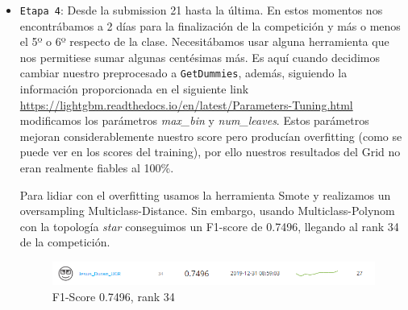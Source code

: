 \begin{itemize}
		\item \texttt{Etapa 4}: Desde la submission 21 hasta la última. En estos momentos nos encontrábamos a 2 días para la finalización de la competición y más o menos el 5º o 6º respecto de la clase. Necesitábamos usar alguna herramienta que nos permitiese sumar algunas centésimas más. Es aquí cuando decidimos cambiar nuestro preprocesado a \texttt{GetDummies}, además, siguiendo la información proporcionada en el siguiente link \url{https://lightgbm.readthedocs.io/en/latest/Parameters-Tuning.html} modificamos los parámetros \textit{max\_bin} y \textit{num\_leaves}.
		Estos parámetros mejoran considerablemente nuestro score pero producían overfitting (como se puede ver en los scores del training), por ello nuestros resultados del Grid no eran realmente fiables al 100\%.
		
		Para lidiar con el overfitting usamos la herramienta Smote y realizamos un oversampling Multiclass-Distance. Sin embargo, usando Multiclass-Polynom con la topología \textit{star} conseguimos un F1-score de 0.7496, llegando al rank 34 de la competición.
		
		
		\begin{figure}[H]
			\centering
			\includegraphics[width=1\textwidth]{img/pole.png}
			\caption{F1-Score 0.7496, rank 34}
		\end{figure}
	\end{itemize}
	
	
	
	
	
	
	
	
	
	
	
	
	
	
	
	
	

	
	
